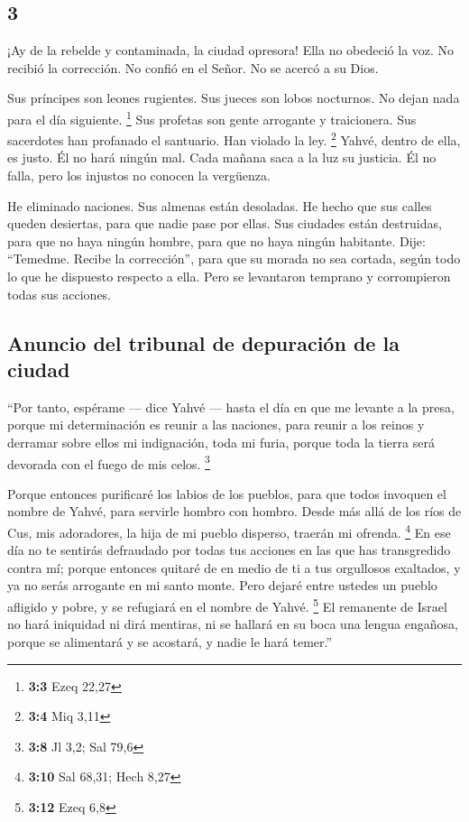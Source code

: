 \begin{paracol}{2}
\hypertarget{section-4}{%
\section{3}\label{section-4}}

 ¡Ay de la rebelde y contaminada, la ciudad opresora!
 Ella no obedeció la voz. No recibió la corrección. No
confió en el Señor. No se acercó a su Dios.

 Sus príncipes son leones rugientes. Sus jueces son lobos
nocturnos. No dejan nada para el día siguiente. \footnote{\textbf{3:3}
  Ezeq 22,27}  Sus profetas son gente arrogante y
traicionera. Sus sacerdotes han profanado el santuario. Han violado la
ley. \footnote{\textbf{3:4} Miq 3,11}  Yahvé, dentro de
ella, es justo. Él no hará ningún mal. Cada mañana saca a la luz su
justicia. Él no falla, pero los injustos no conocen la vergüenza.

 He eliminado naciones. Sus almenas están desoladas. He
hecho que sus calles queden desiertas, para que nadie pase por ellas.
Sus ciudades están destruidas, para que no haya ningún hombre, para que
no haya ningún habitante.  Dije: ``Temedme. Recibe la
corrección'', para que su morada no sea cortada, según todo lo que he
dispuesto respecto a ella. Pero se levantaron temprano y corrompieron
todas sus acciones.

\hypertarget{anuncio-del-tribunal-de-depuraciuxf3n-de-la-ciudad}{%
\subsection{Anuncio del tribunal de depuración de la
ciudad}\label{anuncio-del-tribunal-de-depuraciuxf3n-de-la-ciudad}}

 ``Por tanto, espérame --- dice Yahvé --- hasta el día en
que me levante a la presa, porque mi determinación es reunir a las
naciones, para reunir a los reinos y derramar sobre ellos mi
indignación, toda mi furia, porque toda la tierra será devorada con el
fuego de mis celos. \footnote{\textbf{3:8} Jl 3,2; Sal 79,6}

 Porque entonces purificaré los labios de los pueblos,
para que todos invoquen el nombre de Yahvé, para servirle hombro con
hombro.  Desde más allá de los ríos de Cus, mis
adoradores, la hija de mi pueblo disperso, traerán mi ofrenda.
\footnote{\textbf{3:10} Sal 68,31; Hech 8,27}  En ese día
no te sentirás defraudado por todas tus acciones en las que has
transgredido contra mí; porque entonces quitaré de en medio de ti a tus
orgullosos exaltados, y ya no serás arrogante en mi santo monte.
 Pero dejaré entre ustedes un pueblo afligido y pobre, y
se refugiará en el nombre de Yahvé. \footnote{\textbf{3:12} Ezeq 6,8}
 El remanente de Israel no hará iniquidad ni dirá
mentiras, ni se hallará en su boca una lengua engañosa, porque se
alimentará y se acostará, y nadie le hará temer.''


\end{paracol}
